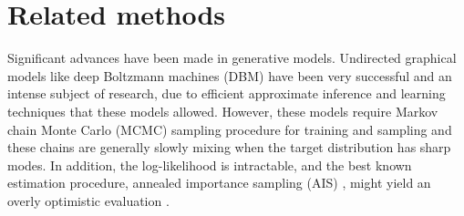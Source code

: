\documentclass{article}
\begin{document}
\section{Related methods}

Significant advances have been made in generative models. Undirected
graphical models like deep Boltzmann machines (DBM) \citep{SalHinton09}
have been very successful and an intense subject of research, due to efficient approximate
inference and learning techniques that these models allowed. However, these
models require Markov chain Monte Carlo (MCMC) sampling procedure for training
and sampling and these chains are generally slowly mixing when the target
distribution has sharp modes. In addition, 
the log-likelihood is intractable, and the best known estimation procedure,
annealed importance sampling (AIS)
\citep{Salakhutdinov+Murray-2008}, might yield an overly optimistic
evaluation \citep{Grosse-et-al-ICML2013}.
\end{document}
